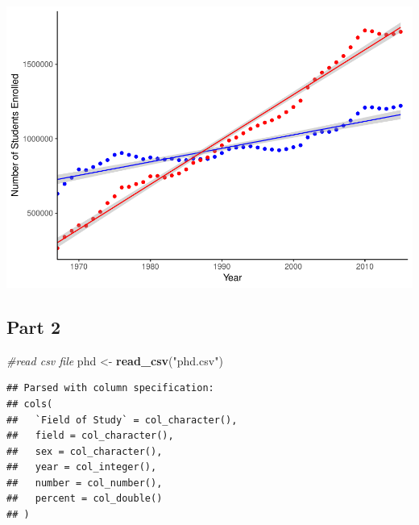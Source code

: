 \documentclass[]{article}
\newenvironment{Shaded}{\begin{snugshade}}{\end{snugshade}}
\newcommand{\KeywordTok}[1]{\textcolor[rgb]{0.13,0.29,0.53}{\textbf{#1}}}
\newcommand{\StringTok}[1]{\textcolor[rgb]{0.31,0.60,0.02}{#1}}
\newcommand{\CommentTok}[1]{\textcolor[rgb]{0.56,0.35,0.01}{\textit{#1}}}
\newcommand{\NormalTok}[1]{#1}
\begin{document}
\includegraphics{Assignment_5_Markdown_files/figure-latex/unnamed-chunk-5-1.pdf}

\subsection{Part 2}\label{part-2}

\begin{Shaded}
\begin{Highlighting}[]
\CommentTok{#read csv file}
\NormalTok{phd <-}\StringTok{ }\KeywordTok{read_csv}\NormalTok{(}\StringTok{"phd.csv"}\NormalTok{) }
\end{Highlighting}
\end{Shaded}

\begin{verbatim}
## Parsed with column specification:
## cols(
##   `Field of Study` = col_character(),
##   field = col_character(),
##   sex = col_character(),
##   year = col_integer(),
##   number = col_number(),
##   percent = col_double()
## )
\end{verbatim}
\end{document}
